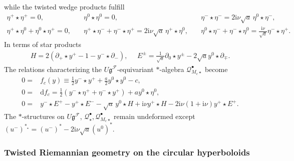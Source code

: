 \documentclass[a4paper,11pt]{article}
\begin{document}
while  the twisted wedge products fulfill
\begin{align*}
\eta^+\!\star\! \eta^+=0, \qquad 
&\eta^0\!\star\! \eta^0=0,\qquad 
&\eta^-\!\star\! \eta^-=2\mathrm{i}\nu \sqrt{a}\, \eta^0\!\star\! \eta^-,\\[8pt]
\eta^+\!\star\! \eta^0+\eta^0\!\star\! \eta^+=0,\quad 
&\eta^+\!\star\! \eta^-+\eta^-\!\star\! \eta^+=2\mathrm{i}\nu\sqrt{a}\,\eta^+\!\star\! \eta^0 ,\quad &
\eta^0\!\star\! \eta^-+\eta^-\!\star\! \eta^0=\frac{\mathrm{i}\nu}{\sqrt{a}}\eta^-\!\star\! \eta^+.
\end{align*}
%
In terms of star products
\begin{align*}
    H    =2(\partial_+\star y^+-1
    -y^-\star\partial_-),~~~~~~
    E^\pm    = \displaystyle\frac{1}{\sqrt{a}}\partial_0\star y^\pm
    -2\sqrt{a}y^0\star\partial_\mp.
\end{align*}
%
%
The relations  characterizing the $U\mathfrak{g}^\mathcal{F}$-equivariant 
$*$-algebra  $\mathcal{Q}_{M_c\star}^\bullet$ become
%
\begin{align*}
    0 =&f_c(y)\equiv
    \frac{1}{2}y^-\star y^++\frac{a}{2}y^0\star y^0-c,\\[6pt]
  0=& \mathrm{d}f_c =\frac{1}{2}(y^-\star\eta^++\eta^-\star y^+)    +ay^0\star\eta^0,\\[6pt]
  0= &y^-\star E^+-y^+\star E^--\sqrt{a}\,y^0\star H+\mathrm{i}\nu y^+\star H-2\mathrm{i}\nu (1+\mathrm{i}\nu) y^+\star E^+.
\end{align*}
%
The $*$-structures on $U\mathfrak{g}^\mathcal{F}$, $\mathcal{Q}^\bullet_\star, \mathcal{Q}_{M_c\star}^\bullet$  remain undeformed except
$(u^-)^{*_\star}
=(u^-)^*-2\mathrm{i}\nu\sqrt{a}(u^0)^*$.

\subsubsection*{Twisted Riemannian geometry on the circular hyperboloids}
\end{document}
